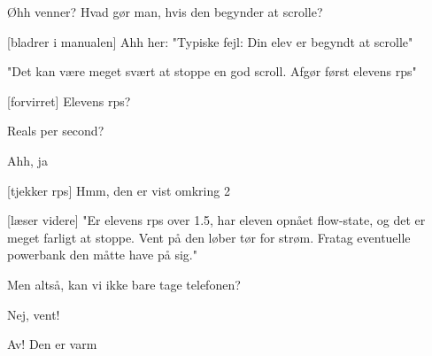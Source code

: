 \documentclass[a4paper,11pt]{article}
\begin{document}
\begin{sketch}
 Øhh venner? Hvad gør man, hvis den begynder at scrolle?

[bladrer i manualen] Ahh her: "Typiske fejl: Din elev er begyndt at scrolle"

 "Det kan være meget svært at stoppe en god scroll. Afgør først elevens rps"


[forvirret] Elevens rps?

 Reals per second?

 Ahh, ja

[tjekker rps] Hmm, den er vist omkring 2


[læser videre] "Er elevens rps over 1.5, har eleven opnået flow-state, og det er meget farligt at stoppe. Vent på den løber tør for strøm. Fratag eventuelle powerbank den måtte have på sig."


 Men altså, kan vi ikke bare tage telefonen?


 Nej, vent!


 Av! Den er varm






\end{sketch}
\end{document}

